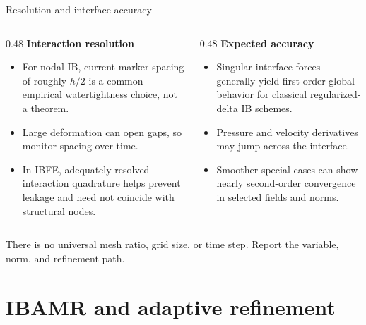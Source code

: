 \documentclass[aspectratio=169,11pt]{beamer}
\begin{document}
\begin{frame}{Resolution and interface accuracy}
\small
\begin{columns}[T,onlytextwidth]
\begin{column}{0.48\textwidth}
\textbf{Interaction resolution}
\begin{itemize}\itemsep4pt
  \item For nodal IB, current marker spacing of roughly \(h/2\) is a common empirical watertightness choice, not a theorem.
  \item Large deformation can open gaps, so monitor spacing over time.
  \item In IBFE, adequately resolved interaction quadrature helps prevent leakage and need not coincide with structural nodes.
\end{itemize}
\end{column}
\begin{column}{0.48\textwidth}
\textbf{Expected accuracy}
\begin{itemize}\itemsep4pt
  \item Singular interface forces generally yield first-order global behavior for classical regularized-delta IB schemes.
  \item Pressure and velocity derivatives may jump across the interface.
  \item Smoother special cases can show nearly second-order convergence in selected fields and norms.
\end{itemize}
\end{column}
\end{columns}
\begin{punchbox}
\small There is no universal mesh ratio, grid size, or time step. Report the variable, norm, and refinement path.
\end{punchbox}
\end{frame}

\section{IBAMR and adaptive refinement}
\end{document}
